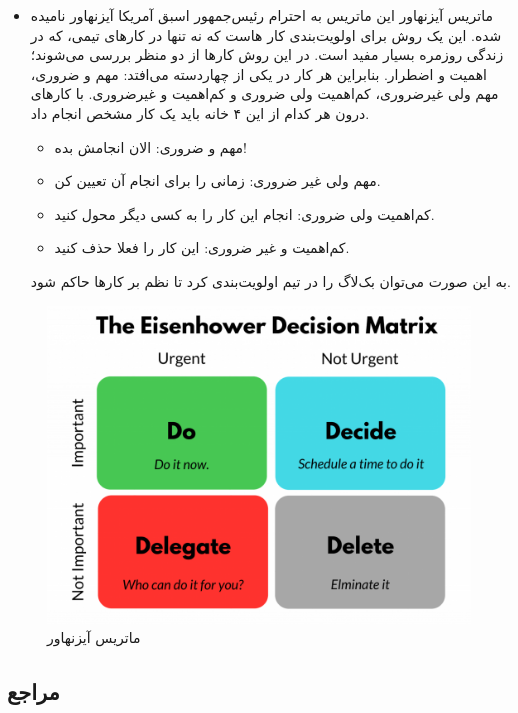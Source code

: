 {\begin{itemize}
    \item ماتریس آیزنهاور
    این ماتریس به احترام رئیس‌جمهور اسبق آمریکا آیزنهاور نامیده شده. این یک روش برای اولویت‌بندی کار هاست که نه تنها در کارهای تیمی، که در زندگی روزمره بسیار مفید است. در این روش کار‌ها از دو منظر بررسی می‌شوند؛ اهمیت و اضطرار. بنابراین هر کار در یکی از چهاردسته می‌افتد: مهم و ضروری، مهم ولی غیرضروری، کم‌اهمیت ولی ضروری و کم‌اهمیت و غیرضروری. با کار‌های درون هر کدام از این ۴ خانه باید یک کار مشخص انجام داد.
    \begin{itemize}
        \item مهم و ضروری: الان انجامش بده!
        \item مهم ولی غیر ضروری: زمانی را برای انجام آن تعیین کن.
        \item کم‌اهمیت ولی ضروری: انجام این کار را به کسی دیگر محول کنید.
        \item کم‌اهمیت و غیر ضروری: این کار را فعلا حذف کنید.
    \end{itemize}
    به این صورت می‌توان بک‌لاگ را در تیم اولویت‌بندی کرد تا نظم بر کارها حاکم شود.
\end{itemize}
    \begin{figure}
	\centering
	\includegraphics[scale=0.3]{figs/3-2}
	\caption{ماتریس آیزنهاور}
    \end{figure}
}

\subsection*{مراجع}

